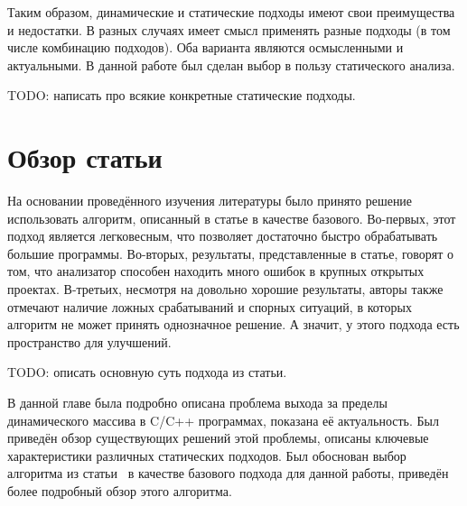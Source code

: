 Таким образом, динамические и статические подходы имеют свои
преимущества и недостатки. В разных случаях имеет смысл применять
разные подходы (в том числе комбинацию подходов). Оба варианта
являются осмысленными и актуальными. В данной работе был сделан выбор
в пользу статического анализа.

TODO: написать про всякие конкретные статические подходы.

\section{Обзор статьи~\cite{li2010practical}}

На основании проведённого изучения литературы было принято решение
использовать алгоритм, описанный в статье \cite{li2010practical} в
качестве базового. Во-первых, этот подход является легковесным, что
позволяет достаточно быстро обрабатывать большие программы. Во-вторых,
результаты, представленные в статье, говорят о том, что анализатор
способен находить много ошибок в крупных открытых проектах. В-третьих,
несмотря на довольно хорошие результаты, авторы также отмечают наличие
ложных срабатываний и спорных ситуаций, в которых алгоритм не может
принять однозначное решение. А значит, у этого подхода есть
пространство для улучшений.

TODO: описать основную суть подхода из статьи.

\chapterconclusion

В данной главе была подробно описана проблема выхода за пределы
динамического массива в C/C++ программах, показана её
актуальность. Был приведён обзор существующих решений этой проблемы,
описаны ключевые характеристики различных статических подходов. Был
обоснован выбор алгоритма из статьи~\cite{li2010practical} в качестве
базового подхода для данной работы, приведён более подробный обзор
этого алгоритма.
